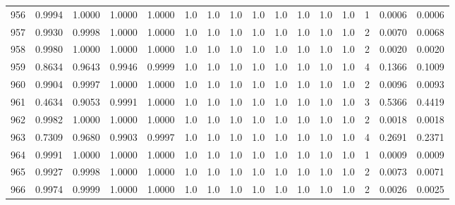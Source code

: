\begin{tabular}{lrrrrrrrrrrrrrrr}
956 &      0.9994 &  1.0000 &  1.0000 &  1.0000 &     1.0 &     1.0 &     1.0 &     1.0 &     1.0 &     1.0 &      1.0 &        1.0 &      1 &                    0.0006 &                     0.0006 \\
957 &      0.9930 &  0.9998 &  1.0000 &  1.0000 &     1.0 &     1.0 &     1.0 &     1.0 &     1.0 &     1.0 &      1.0 &        1.0 &      2 &                    0.0070 &                     0.0068 \\
958 &      0.9980 &  1.0000 &  1.0000 &  1.0000 &     1.0 &     1.0 &     1.0 &     1.0 &     1.0 &     1.0 &      1.0 &        1.0 &      2 &                    0.0020 &                     0.0020 \\
959 &      0.8634 &  0.9643 &  0.9946 &  0.9999 &     1.0 &     1.0 &     1.0 &     1.0 &     1.0 &     1.0 &      1.0 &        1.0 &      4 &                    0.1366 &                     0.1009 \\
960 &      0.9904 &  0.9997 &  1.0000 &  1.0000 &     1.0 &     1.0 &     1.0 &     1.0 &     1.0 &     1.0 &      1.0 &        1.0 &      2 &                    0.0096 &                     0.0093 \\
961 &      0.4634 &  0.9053 &  0.9991 &  1.0000 &     1.0 &     1.0 &     1.0 &     1.0 &     1.0 &     1.0 &      1.0 &        1.0 &      3 &                    0.5366 &                     0.4419 \\
962 &      0.9982 &  1.0000 &  1.0000 &  1.0000 &     1.0 &     1.0 &     1.0 &     1.0 &     1.0 &     1.0 &      1.0 &        1.0 &      2 &                    0.0018 &                     0.0018 \\
963 &      0.7309 &  0.9680 &  0.9903 &  0.9997 &     1.0 &     1.0 &     1.0 &     1.0 &     1.0 &     1.0 &      1.0 &        1.0 &      4 &                    0.2691 &                     0.2371 \\
964 &      0.9991 &  1.0000 &  1.0000 &  1.0000 &     1.0 &     1.0 &     1.0 &     1.0 &     1.0 &     1.0 &      1.0 &        1.0 &      1 &                    0.0009 &                     0.0009 \\
965 &      0.9927 &  0.9998 &  1.0000 &  1.0000 &     1.0 &     1.0 &     1.0 &     1.0 &     1.0 &     1.0 &      1.0 &        1.0 &      2 &                    0.0073 &                     0.0071 \\
966 &      0.9974 &  0.9999 &  1.0000 &  1.0000 &     1.0 &     1.0 &     1.0 &     1.0 &     1.0 &     1.0 &      1.0 &        1.0 &      2 &                    0.0026 &                     0.0025 \\

\end{tabular}
